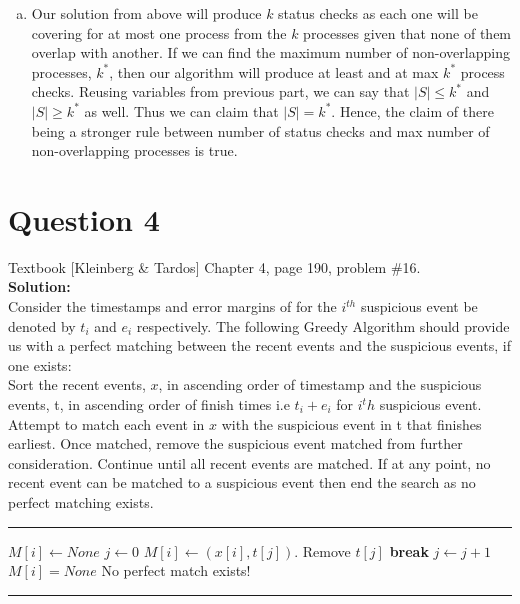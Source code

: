 \documentclass[11pt]{article}
\makeatletter
\newcommand{\Break}{\State \textbf{break} }
\newenvironment{breakablealgorithm}
{%
	\begin{center}
		\refstepcounter{algorithm}%
		\hrule height.8pt depth0pt \kern2pt%
		\renewcommand{\caption}[2][\relax]{%
			{\raggedright\textbf{\ALG@name~\thealgorithm} ##2\par}%
			\ifx\relax##1\relax %
			\addcontentsline{loa}{algorithm}{\protect\numberline{\thealgorithm}##2}%
			\else %
			\addcontentsline{loa}{algorithm}{\protect\numberline{\thealgorithm}##1}%
			\fi
			\kern2pt\hrule\kern2pt
		}
	}{%
		\kern2pt\hrule\relax%
	\end{center}
}
\makeatother
\begin{document}
\begin{enumerate}[(a)]
\item Our solution from above will produce $ k $ status checks as each one will be covering for at most one process from the $ k $ processes given that none of them overlap with another. If we can find the maximum number of non-overlapping processes, $ k^* $, then our algorithm will produce at least and at max $ k^* $ process checks. Reusing variables from previous part, we can say that $ |S| \leq k^* $ and $ |S| \geq k^* $ as well. Thus we can claim that $ |S| = k^* $. Hence, the claim of there being a stronger rule between number of status checks and max number of non-overlapping processes is true.

\end{enumerate}

\clearpage
\section{Question 4} Textbook [Kleinberg \& Tardos] Chapter 4, page 190, problem \#16. \\
\textbf{Solution:} \\

Consider the timestamps and error margins of for the $ i^{th} $ suspicious event be denoted by $ t_i $ and $ e_i $ respectively. The following Greedy Algorithm should provide us with a perfect matching between the recent events and the suspicious events, if one exists: \\

Sort the recent events, $ x $, in ascending order of timestamp and the suspicious events, t, in ascending order of finish times i.e $ t_i+e_i $ for $ i^th $ suspicious event. Attempt to match each event in $ x $ with the suspicious event in t that finishes earliest. Once matched, remove the suspicious event matched from further consideration. Continue until all recent events are matched. If at any point, no recent event can be matched to a suspicious event then end the search as no perfect matching exists.

\begin{breakablealgorithm}
	\begin{algorithmic}[1]
			\State $M[i] \gets None$
			\State $ j \gets 0$
					\State $ M[i] \gets (x[i], t[j])$.
					\State Remove $ t[j] $
					\Break
				\EndIf
				\State $ j \gets j+1$
			\EndWhile
			\If $M[i] = None$
				\State \Return No perfect match exists!
			\EndIf
		\EndFor
	\end{algorithmic}
\end{breakablealgorithm}
\end{document}
